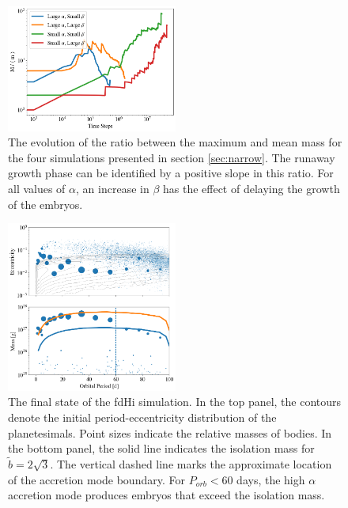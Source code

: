 \documentclass[twocolumn]{aastex63}
\begin{document}
\begin{figure}
\begin{center}
    \includegraphics[width=0.5\textwidth]{figures/alpha_beta_evo.png}
    \caption{The evolution of the ratio between the maximum and mean mass for the four simulations presented in section \ref{sec:narrow}. The runaway growth phase can be identified by a positive slope in this ratio. For all values of $\alpha$, an increase in $\beta$ has the effect of delaying the growth of the embryos.\label{fig:alpha_beta_evo}}
\end{center}
\end{figure}


\begin{figure}
\begin{center}
    \includegraphics[width=0.5\textwidth]{figures/fulldisk_e_m.png}
    \caption{The final state of the fdHi simulation. In the top panel,
      the contours denote the initial period-eccentricity distribution
      of the planetesimals. Point sizes indicate the relative masses
      of bodies. In the bottom panel, the solid line indicates the
      isolation mass for $\tilde{b} = 2 \sqrt{3}$. The vertical dashed line marks the approximate location of the accretion mode boundary. For $P_{orb} < 60$ days, the high $\alpha$ accretion mode produces embryos that exceed the isolation mass.\label{fig:fulldisk_e_m}}
\end{center}
\end{figure}
\end{document}
